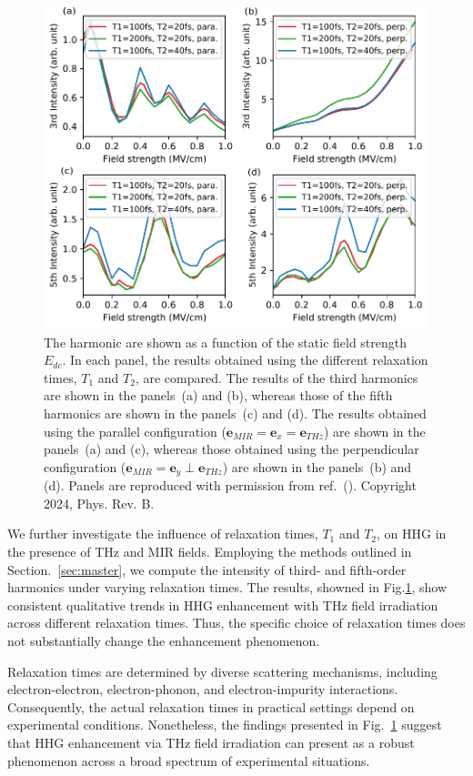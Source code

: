 \begin{figure}[tb]
	\includegraphics[width=0.9\linewidth]{pic/SI_t1t2.pdf}
	\caption{\label{fig:intensity_relaxation}
		The harmonic are shown as a function of the static field strength $E_{dc}$. In each panel, the results obtained using the different relaxation times, $T_1$ and $T_2$, are compared. The results of the third harmonics are shown in the panels~(a) and (b), whereas those of the fifth harmonics are shown in the panels~(c) and (d). The results obtained using the parallel configuration ($\mathbf e_{MIR}=\mathbf e_x = \mathbf e_{THz}$) are shown in the panels~(a) and (c), whereas those obtained using the perpendicular configuration ($\mathbf e_{MIR}=\mathbf e_y \perp \mathbf e_{THz}$) are shown in the panels~(b) and (d). Panels are reproduced with permission from ref.~(\cite{PhysRevB.109.045421}). Copyright 2024, Phys. Rev. B.
	}
\end{figure}

We further investigate the influence of relaxation times, $T_1$ and $T_2$, on HHG in the presence
of THz and MIR fields. Employing the methods outlined in Section.~\ref{sec:master}, we compute the intensity of third- and fifth-order harmonics under varying relaxation times. The results, showned in Fig.\ref{fig:intensity_relaxation}, show consistent qualitative trends in HHG enhancement with THz field irradiation across different relaxation times. Thus, the specific choice of relaxation times does not substantially change the enhancement phenomenon.

Relaxation times are determined by diverse scattering mechanisms, including electron-electron,
electron-phonon, and electron-impurity interactions. Consequently, the actual relaxation times in
practical settings depend on experimental conditions. Nonetheless, the findings presented in
Fig.~\ref{fig:intensity_relaxation} suggest that HHG enhancement via THz field irradiation can
present as a robust phenomenon across a broad spectrum of experimental situations.

